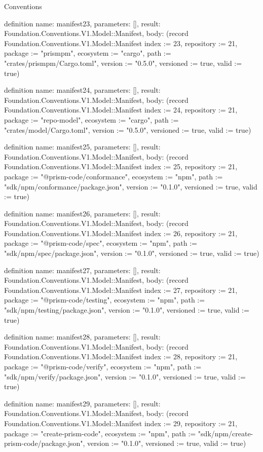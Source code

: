 \begin{lexlean}{Conventions}
\begin{semanticmodule}
definition{
  name: manifest23,
  parameters: [],
  result: Foundation.Conventions.V1.Model::Manifest,
  body: (record Foundation.Conventions.V1.Model::Manifest {index := 23, repository := 21, package := "prismpm", ecosystem := "cargo", path := "crates/prismpm/Cargo.toml", version := "0.5.0", versioned := true, valid := true})
}

definition{
  name: manifest24,
  parameters: [],
  result: Foundation.Conventions.V1.Model::Manifest,
  body: (record Foundation.Conventions.V1.Model::Manifest {index := 24, repository := 21, package := "repo-model", ecosystem := "cargo", path := "crates/model/Cargo.toml", version := "0.5.0", versioned := true, valid := true})
}

definition{
  name: manifest25,
  parameters: [],
  result: Foundation.Conventions.V1.Model::Manifest,
  body: (record Foundation.Conventions.V1.Model::Manifest {index := 25, repository := 21, package := "@prism-code/conformance", ecosystem := "npm", path := "sdk/npm/conformance/package.json", version := "0.1.0", versioned := true, valid := true})
}

definition{
  name: manifest26,
  parameters: [],
  result: Foundation.Conventions.V1.Model::Manifest,
  body: (record Foundation.Conventions.V1.Model::Manifest {index := 26, repository := 21, package := "@prism-code/spec", ecosystem := "npm", path := "sdk/npm/spec/package.json", version := "0.1.0", versioned := true, valid := true})
}

definition{
  name: manifest27,
  parameters: [],
  result: Foundation.Conventions.V1.Model::Manifest,
  body: (record Foundation.Conventions.V1.Model::Manifest {index := 27, repository := 21, package := "@prism-code/testing", ecosystem := "npm", path := "sdk/npm/testing/package.json", version := "0.1.0", versioned := true, valid := true})
}

definition{
  name: manifest28,
  parameters: [],
  result: Foundation.Conventions.V1.Model::Manifest,
  body: (record Foundation.Conventions.V1.Model::Manifest {index := 28, repository := 21, package := "@prism-code/verify", ecosystem := "npm", path := "sdk/npm/verify/package.json", version := "0.1.0", versioned := true, valid := true})
}

definition{
  name: manifest29,
  parameters: [],
  result: Foundation.Conventions.V1.Model::Manifest,
  body: (record Foundation.Conventions.V1.Model::Manifest {index := 29, repository := 21, package := "create-prism-code", ecosystem := "npm", path := "sdk/npm/create-prism-code/package.json", version := "0.1.0", versioned := true, valid := true})
}


\end{semanticmodule}
\end{lexlean}
